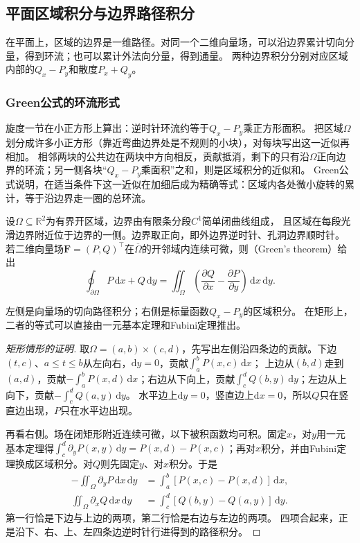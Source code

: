 \subsection{平面区域积分与边界路径积分}

在平面上，区域的边界是一维路径。对同一个二维向量场，可以沿边界累计切向分量，得到环流；也可以累计外法向分量，得到通量。
两种边界积分分别对应区域内部的$Q_x-P_y$和散度$P_x+Q_y$。

\subsubsection{Green公式的环流形式}

旋度一节在小正方形上算出：逆时针环流约等于$Q_x-P_y$乘正方形面积。
把区域$\Omega$划分成许多小正方形（靠近弯曲边界处是不规则的小块），对每块写出这一近似再相加。
相邻两块的公共边在两块中方向相反，贡献抵消，剩下的只有沿$\Omega$正向边界的环流；另一侧各块“$Q_x-P_y$乘面积”之和，则是区域积分的近似和。
Green公式说明，在适当条件下这一近似在加细后成为精确等式：区域内各处微小旋转的累计，等于沿边界走一圈的总环流。
\begin{theorem}[Green公式]
\label{thm:multivariable-green}
设$\Omega\subseteq\mathbb R^2$为有界开区域，边界由有限条分段$C^1$简单闭曲线组成，
且区域在每段光滑边界附近位于边界的一侧。边界取正向，即外边界逆时针、孔洞边界顺时针。
若二维向量场$\bm F=(P,Q)^\top$在$\overline\Omega$的开邻域内连续可微，则（Green's theorem）给出
\begin{equation}
 \oint_{\partial\Omega}P\,\mathrm dx+Q\,\mathrm dy
 =\iint_\Omega\left(\frac{\partial Q}{\partial x}-\frac{\partial P}{\partial y}\right)\,\mathrm dx\,\mathrm dy.
 \label{eq:multivariable-green}
\end{equation}
\end{theorem}
左侧是向量场的切向路径积分；右侧是标量函数$Q_x-P_y$的区域积分。
在矩形上，二者的等式可以直接由一元基本定理和Fubini定理推出。
\begin{proof}[矩形情形的证明]
取$\Omega=(a,b)\times(c,d)$，先写出左侧沿四条边的贡献。下边$(t,c)$、$a\leq t\leq b$从左向右，$\mathrm dy=0$，贡献$\int_a^bP(x,c)\,\mathrm dx$；
上边从$(b,d)$走到$(a,d)$，贡献$-\int_a^bP(x,d)\,\mathrm dx$；右边从下向上，贡献$\int_c^dQ(b,y)\,\mathrm dy$；左边从上向下，贡献$-\int_c^dQ(a,y)\,\mathrm dy$。
水平边上$\mathrm dy=0$，竖直边上$\mathrm dx=0$，所以$Q$只在竖直边出现，$P$只在水平边出现。

再看右侧。场在闭矩形附近连续可微，以下被积函数均可积。固定$x$，对$y$用一元基本定理得$\int_c^d\partial_yP(x,y)\,\mathrm dy=P(x,d)-P(x,c)$；再对$x$积分，并由Fubini定理换成区域积分。对$Q$则先固定$y$、对$x$积分。于是
\[
 \begin{aligned}
 -\iint_\Omega\partial_yP\,\mathrm dx\,\mathrm dy
 &=\int_a^b[P(x,c)-P(x,d)]\,\mathrm dx,\\
 \iint_\Omega\partial_xQ\,\mathrm dx\,\mathrm dy
 &=\int_c^d[Q(b,y)-Q(a,y)]\,\mathrm dy.
 \end{aligned}
\]
第一行恰是下边与上边的两项，第二行恰是右边与左边的两项。
四项合起来，正是沿下、右、上、左四条边逆时针行进得到的路径积分。
\end{proof}
